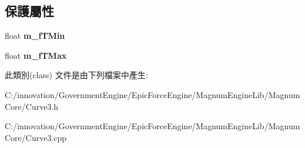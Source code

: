 \subsection*{保護屬性}
\begin{DoxyCompactItemize}
\item 
float {\bfseries m\+\_\+f\+T\+Min}\hypertarget{class_i_dream_sky_1_1_curve3_a5d0ac48acd4521e9478e2a4fd116df7e}{}\label{class_i_dream_sky_1_1_curve3_a5d0ac48acd4521e9478e2a4fd116df7e}

\item 
float {\bfseries m\+\_\+f\+T\+Max}\hypertarget{class_i_dream_sky_1_1_curve3_a21423f101e56aa3d5c326ada9986ae4a}{}\label{class_i_dream_sky_1_1_curve3_a21423f101e56aa3d5c326ada9986ae4a}

\end{DoxyCompactItemize}


此類別(class) 文件是由下列檔案中產生\+:\begin{DoxyCompactItemize}
\item 
C\+:/innovation/\+Government\+Engine/\+Epic\+Force\+Engine/\+Magnum\+Engine\+Lib/\+Magnum\+Core/Curve3.\+h\item 
C\+:/innovation/\+Government\+Engine/\+Epic\+Force\+Engine/\+Magnum\+Engine\+Lib/\+Magnum\+Core/Curve3.\+cpp\end{DoxyCompactItemize}
